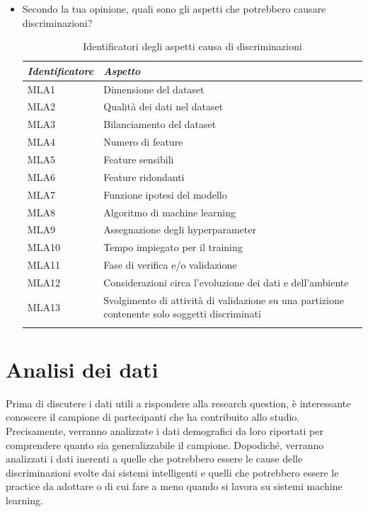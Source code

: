 \begin{itemize}
    \item Secondo la tua opinione, quali sono gli aspetti che potrebbero causare discriminazioni?
    \begin{longtable}{| p{} | p{} |}
      \hline\textbf{\textit{Identificatore}} & \textbf{\textit{Aspetto}}
        \\ \hline
        \rowcolor{Gray!30}
        MLA1 & Dimensione del dataset
        \\ \hline
        MLA2 & Qualità dei dati nel dataset
        \\ \hline
        \rowcolor{Gray!30}
        MLA3 & Bilanciamento del dataset
         \\ \hline
        MLA4 & Numero di feature
        \\ \hline
        \rowcolor{Gray!30}
        MLA5 & Feature sensibili
        \\ \hline
        MLA6 & Feature ridondanti
        \\ \hline
        \rowcolor{Gray!30}
        MLA7 & Funzione ipotesi del modello
         \\ \hline
        MLA8 & Algoritmo di machine learning
        \\ \hline
        \rowcolor{Gray!30}
        MLA9 & Assegnazione degli hyperparameter
        \\ \hline
        MLA10 & Tempo impiegato per il training
        \\ \hline
        \rowcolor{Gray!30}
        MLA11 & Fase di verifica e/o validazione
         \\ \hline
        MLA12 & Considerazioni circa l'evoluzione dei dati e dell'ambiente
        \\ \hline
        \rowcolor{Gray!30}
        MLA13 & Svolgimento di attività di validazione su una partizione contenente solo soggetti discriminati
         \\ \hline
        \caption{Identificatori degli aspetti causa di discriminazioni} %
        \label{table-root-id-1}
    \end{longtable}
\end{itemize}


\section{Analisi dei dati}
Prima di discutere i dati utili a rispondere alla research question, è interessante conoscere il campione di partecipanti che ha contribuito allo studio. Precisamente, verranno analizzate i dati demografici da loro riportati per comprendere quanto sia generalizzabile il campione. Dopodiché, verranno analizzati i dati inerenti a quelle che potrebbero essere le cause delle discriminazioni svolte dai sistemi intelligenti e quelli che potrebbero essere le practice da adottare o di cui fare a meno quando si lavora su sistemi machine learning.

